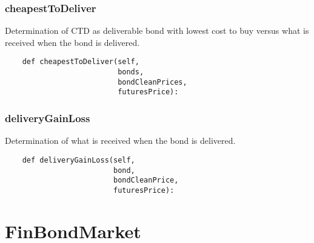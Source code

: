 \documentclass[twoside,11pt]{book}
\begin{document}
\subsubsection*{{\bf cheapestToDeliver}}
Determination of CTD as deliverable bond with lowest cost to buy versus what is received when the bond is delivered.  

\begin{lstlisting}
    def cheapestToDeliver(self,
                          bonds,
                          bondCleanPrices,
                          futuresPrice):
\end{lstlisting}

\subsubsection*{{\bf deliveryGainLoss}}
Determination of what is received when the bond is delivered.  

\begin{lstlisting}
    def deliveryGainLoss(self,
                         bond,
                         bondCleanPrice,
                         futuresPrice):
\end{lstlisting}

\newpage
\section{FinBondMarket}
\end{document}
